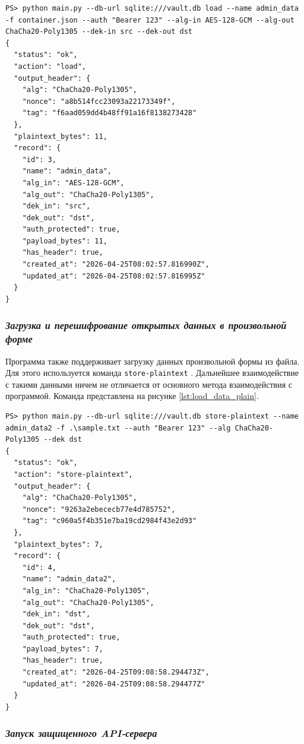 \documentclass[14pt, a4paper]{extarticle}
\renewcommand{\texttt}[1]{%
  {\def\UrlFont{\ttfamily}\nolinkurl{#1}}%
}
\begin{document}
\begin{lstlisting}[style=bashcommand, caption={Загрузка данных из контейнера}, label=lst:load_data]
PS> python main.py --db-url sqlite:///vault.db load --name admin_data -f container.json --auth "Bearer 123" --alg-in AES-128-GCM --alg-out ChaCha20-Poly1305 --dek-in src --dek-out dst
{
  "status": "ok",
  "action": "load",
  "output_header": {
    "alg": "ChaCha20-Poly1305",
    "nonce": "a8b514fcc23093a22173349f",
    "tag": "f6aad059dd4b48ff91a16f8138273428"
  },
  "plaintext_bytes": 11,
  "record": {
    "id": 3,
    "name": "admin_data",
    "alg_in": "AES-128-GCM",
    "alg_out": "ChaCha20-Poly1305",
    "dek_in": "src",
    "dek_out": "dst",
    "auth_protected": true,
    "payload_bytes": 11,
    "has_header": true,
    "created_at": "2026-04-25T08:02:57.816990Z",
    "updated_at": "2026-04-25T08:02:57.816995Z"
  }
}
\end{lstlisting}

\subsubsection*{\textit{Загрузка и перешифрование открытых данных в произвольной форме}}

Программа также поддерживает загрузку данных произвольной формы из файла. Для этого используется команда \texttt{store-plaintext}. Дальнейшее взаимодействие с такими данными ничем не отличается от основного метода взаимодействия с программой. Команда представлена на рисунке \ref{lst:load_data_plain}.

\begin{lstlisting}[style=bashcommand, caption={Загрузка данных произвольного формата}, label=lst:load_data_plain]
PS> python main.py --db-url sqlite:///vault.db store-plaintext --name admin_data2 -f .\sample.txt --auth "Bearer 123" --alg ChaCha20-Poly1305 --dek dst
{
  "status": "ok",
  "action": "store-plaintext",
  "output_header": {
    "alg": "ChaCha20-Poly1305",
    "nonce": "9263a2ebececb77e4d785752",
    "tag": "c960a5f4b351e7ba19cd2984f43e2d93"
  },
  "plaintext_bytes": 7,
  "record": {
    "id": 4,
    "name": "admin_data2",
    "alg_in": "ChaCha20-Poly1305",
    "alg_out": "ChaCha20-Poly1305",
    "dek_in": "dst",
    "dek_out": "dst",
    "auth_protected": true,
    "payload_bytes": 7,
    "has_header": true,
    "created_at": "2026-04-25T09:08:58.294473Z",
    "updated_at": "2026-04-25T09:08:58.294477Z"
  }
}
\end{lstlisting}

\subsubsection*{\textit{Запуск защищенного API-сервера}}
\end{document}
